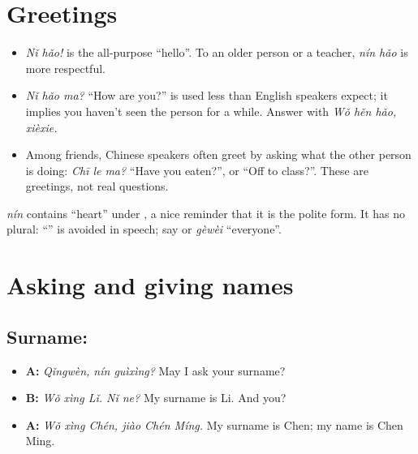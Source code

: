 \section{Greetings}

\begin{itemize}
  \item {} \emph{Nǐ hǎo!} is the all-purpose ``hello''. To an older person or a
        teacher,  \emph{nín hǎo} is more respectful.
  \item {} \emph{Nǐ hǎo ma?} ``How are you?'' is used less than English speakers
        expect; it implies you haven't seen the person for a while. Answer with
         \emph{Wǒ hěn hǎo, xièxie.}
  \item Among friends, Chinese speakers often greet by asking what the other person is
        doing:  \emph{Chī le ma?} ``Have you eaten?'', or 
        ``Off to class?''. These are greetings, not real questions.
\end{itemize}

\begin{aside}
 \emph{nín} contains  ``heart'' under , a nice reminder that it is
the polite form. It has no plural: ``'' is avoided in speech; say
 or  \emph{gèwèi} ``everyone''.
\end{aside}

\section{Asking and giving names}

\subsection{Surname: }

\begin{example}\leavevmode
\begin{itemize}
  \item \textbf{A:}  \emph{Qǐngwèn, nín guìxìng?} May I ask your surname?
  \item \textbf{B:}  \emph{Wǒ xìng Lǐ. Nǐ ne?} My surname is Li. And you?
  \item \textbf{A:}  \emph{Wǒ xìng Chén, jiào Chén Míng.} My surname is Chen;
        my name is Chen Ming.
\end{itemize}
\end{example}

